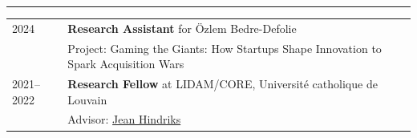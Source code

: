\hrule %

\begin{longtable}[l]{@{}p{} p{}}

    2024 & \textbf{Research Assistant} for Özlem Bedre-Defolie \\
    & Project: Gaming the Giants: How Startups Shape Innovation to Spark Acquisition Wars \\[5pt]
    2021--2022 & \textbf{Research Fellow} at LIDAM/CORE, Université catholique de Louvain \\
    & Advisor: \href{https://hindriksjean.com/}{Jean Hindriks} \\

\end{longtable}